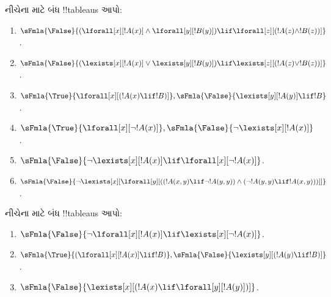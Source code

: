 \documentclass[../../../include/open-logic-section]{subfiles}
\begin{document}
\begin{prob}
નીચેના માટે બંધ !!{tableau}s આપો:
\begin{enumerate}
\item $\sFmla{\False}{(\lforall[x][!A(x)] \land \lforall[y][!B(y)])
\lif \lforall[z][(!A(z) \land !B(z))]}$.
\item $\sFmla{\False}{(\lexists[x][!A(x)] \lor \lexists[y][!B(y)])
\lif \lexists[z][(!A(z) \lor !B(z))]}$.
\item $\sFmla{\True}{\lforall[x][(!A(x) \lif !B)]},
\sFmla{\False}{\lexists[y][!A(y)] \lif !B}$.
\item $\sFmla{\True}{\lforall[x][\lnot !A(x)]},
\sFmla{\False}{\lnot\lexists[x][!A(x)]}$.
\item $\sFmla{\False}{\lnot\lexists[x][!A(x)] \lif \lforall[x][\lnot
!A(x)]}$.
\item $\sFmla{\False}{\lnot\lexists[x][\lforall[y][((!A(x,y) \lif
\lnot !A(y,y)) \land (\lnot !A(y,y) \lif !A(x,y)))]]}$.
\end{enumerate}
\end{prob}

\begin{prob}
નીચેના માટે બંધ !!{tableau}s આપો:
\begin{enumerate}
\item $\sFmla{\False}{\lnot\lforall[x][!A(x)] \lif \lexists[x][\lnot!A(x)]}$.
\item $\sFmla{\True}{(\lforall[x][!A(x)] \lif !B)}, \sFmla{\False}{\lexists[y][(!A(y) \lif !B)]}$.
\item $\sFmla{\False}{\lexists[x][(!A(x) \lif \lforall[y][!A(y)])]}$.
\end{enumerate}
\end{prob}
\end{document}
